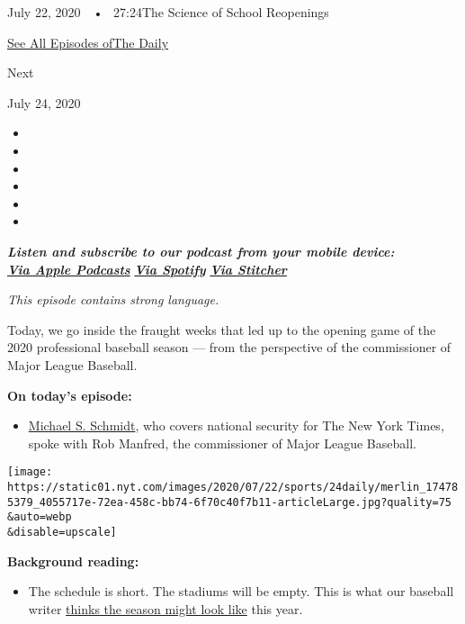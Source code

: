July 22, 2020~~•~ 27:24The Science of School Reopenings

\href{https://www.nytimes.com/column/the-daily}{See All Episodes ofThe
Daily}

Next

July 24, 2020

\begin{itemize}
\item
\item
\item
\item
\item
\item
\end{itemize}

\emph{\textbf{Listen and subscribe to our podcast from your mobile
device:}}\\
\textbf{\href{https://itunes.apple.com/us/podcast/the-daily/id1200361736?mt=2}{\emph{Via
Apple Podcasts}}} \emph{\textbf{\textbar{}}}
\textbf{\href{https://open.spotify.com/show/3IM0lmZxpFAY7CwMuv9H4g?si=SfuMSC55R1qprFsRZU3_zw}{\emph{Via
Spotify}}} \emph{\textbf{\textbar{}}}
\textbf{\href{http://www.stitcher.com/podcast/the-new-york-times/the-daily-10}{\emph{Via
Stitcher}}}

\emph{This episode contains strong language.}

Today, we go inside the fraught weeks that led up to the opening game of
the 2020 professional baseball season --- from the perspective of the
commissioner of Major League Baseball.

\textbf{On today's episode:}

\begin{itemize}
\tightlist
\item
  \href{https://www.nytimes.com/by/michael-s-schmidt?smid=pc-thedaily}{Michael
  S. Schmidt}, who covers national security for The New York Times,
  spoke with Rob Manfred, the commissioner of Major League Baseball.
\end{itemize}

\texttt{[image: https://static01.nyt.com/images/2020/07/22/sports/24daily/merlin\_174785379\_4055717e-72ea-458c-bb74-6f70c40f7b11-articleLarge.jpg?quality=75\\\&auto=webp\\\&disable=upscale]}

\textbf{Background reading:}

\begin{itemize}
\tightlist
\item
  The schedule is short. The stadiums will be empty. This is what our
  baseball writer
  \href{https://www.nytimes.com/2020/07/23/sports/baseball/mlb-season-coronavirus.html}{thinks
  the season might look like} this year.
\end{itemize}

